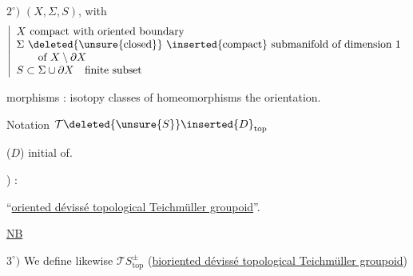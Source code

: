 $2^\circ)$ $(X,\Sigma,S)$, with
\[
\left|\begin{array}{l}
X\ \text{compact with oriented boundary}\\
\Sigma\ \text{\deleted{\unsure{closed}} \inserted{compact} submanifold of dimension $1$}\\
\qquad\text{of }X\setminus\partial X\\
S\subset\Sigma\cup\partial X\quad\text{finite subset}
\end{array}\right.
\]

morphisms : isotopy classes of homeomorphisms  the orientation.

Notation $\mathcal T\deleted{\unsure{S}}\inserted{D}_{\mathrm{top}}$

($D$) initial of.

) :

``\uline{oriented dévissé topological Teichmüller groupoid}''.

\uline{NB}

$3^\circ)$ We define likewise $\mathcal TS_{\mathrm{top}}^\pm$
(\uline{bioriented dévissé topological Teichmüller groupoid})

